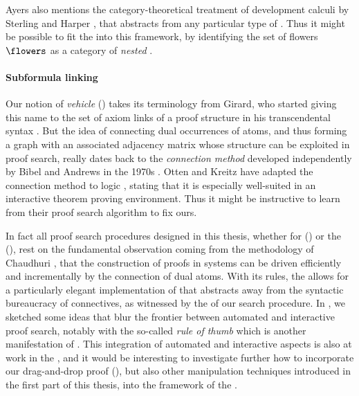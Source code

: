 \begin{scope}
Ayers also mentions the category-theoretical treatment of development calculi by
Sterling and Harper , that abstracts from any
particular type of . Thus it might be possible to fit the  into this framework, by identifying the set of flowers $\flowers$ as a
category of \emph{nested }.

\paragraph{Subformula linking}

Our notion of \emph{vehicle} () takes its terminology from
Girard, who started giving this name to the set of axiom links of a proof
structure in his transcendental syntax . But the idea of connecting dual
occurrences of atoms, and thus forming a graph with an associated adjacency
matrix whose structure can be exploited in proof search, really dates back to
the \emph{connection method} developed independently by Bibel and Andrews in the
1970s . Otten and Kreitz have adapted the connection method
to  logic , stating that it is
especially well-suited in an interactive theorem proving environment. Thus it
might be instructive to learn from their proof search algorithm to fix ours.

In fact all proof search procedures designed in this thesis, whether for  () or the 
(), rest on the fundamental observation coming from the
 methodology of Chaudhuri , that the
construction of proofs in  systems can be driven efficiently and
incrementally by the connection of dual atoms. With its  rules, the
 allows for a particularly elegant implementation of  that abstracts away from the syntactic bureaucracy of 
connectives, as witnessed by the  of our search procedure. In
, we sketched some ideas that blur the frontier
between automated and interactive proof search, notably with the so-called
\emph{rule of thumb} which is another manifestation of . This
integration of automated and interactive aspects is also at work in the , and it would be interesting to investigate further how to incorporate
our drag-and-drop proof  (), but also other 
manipulation techniques introduced in the first part of this thesis, into the
 framework of the .


\end{scope}
